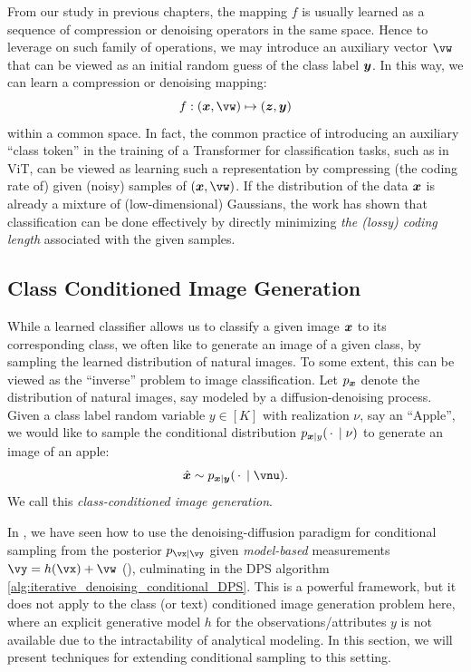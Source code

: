 \documentclass[../../book-main.tex]{subfiles}
\begin{document}
From our study in previous chapters, the mapping $f$ is usually learned as a sequence of compression or denoising operators in the same space. Hence to leverage on such family of operations, we may introduce an auxiliary vector $\vw$ that can be viewed as an initial random guess of the class label $\bm{y}$. In this way, we can learn a compression or denoising mapping:
\begin{equation}\label{eq:classifier-with-class-token}
    f: (\x, \vw) \mapsto (\z, \y)
\end{equation}
within a common space. In fact, the common practice of introducing an auxiliary ``class token'' in the training of a Transformer for classification tasks, such as in ViT, can be viewed as learning such a representation by compressing (the coding rate of) given (noisy) samples of $(\x, \vw)$. If the distribution of the data $\bm{x}$ is already a mixture of (low-dimensional) Gaussians, the work \cite{wright2008classification} has shown that classification can be done effectively by directly minimizing {\em the (lossy) coding length} associated with the given samples.


\subsection{Class Conditioned Image Generation}\label{sub:cfg} 
While a learned classifier allows us to classify a given image $\bm{x}$ to its
corresponding class, we often like to generate an image of a given class, by
sampling the learned distribution of natural images. To some extent, this can be
viewed as the ``inverse'' problem to image classification. Let $p_{\bm{x}}$ denote
the distribution of natural images, say modeled by a diffusion-denoising
process. Given a class label random variable $y \in [K]$ with realization $\nu$, say
an ``Apple'', we would like to sample the conditional distribution $p_{\bm{x} \mid
y}(\,\cdot\, \mid \nu)$ to generate an image of an apple:
\begin{equation}
  \hat{\x} \sim p_{\x\mid \y}(\,\cdot\, \mid \vnu).
\end{equation}
We call this {\em class-conditioned image generation}.

In , we have seen how to use the denoising-diffusion paradigm for
conditional sampling from the posterior $p_{\vx \mid \vy}$ given
\textit{model-based} measurements $\vy = h(\vx) + \vw$
(), culminating in the
DPS algorithm \eqref{alg:iterative_denoising_conditional_DPS}. This is a powerful
framework, but it does not apply to the class (or text) conditioned image
generation problem here, where an explicit generative model $h$ for the
observations/attributes $y$ is not available due to the
intractability of analytical modeling. In this section, we will present techniques for extending
conditional sampling to this setting.
\end{document}

